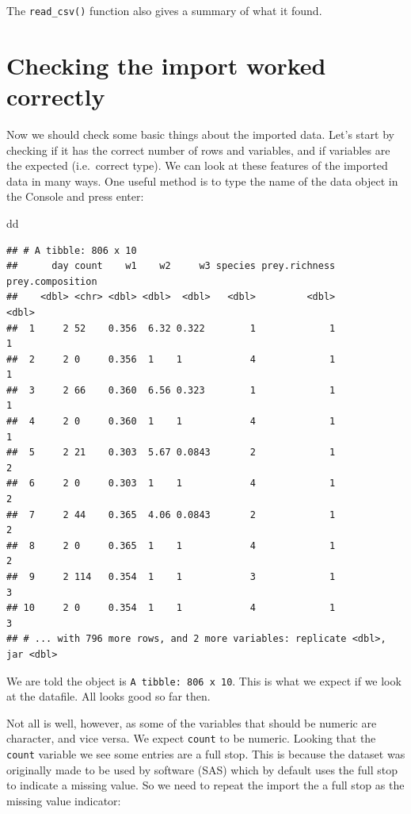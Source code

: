 \documentclass[]{book}
\newenvironment{Shaded}{\begin{snugshade}}{\end{snugshade}}
\newcommand{\NormalTok}[1]{#1}
\begin{document}
The \texttt{read\_csv()} function also gives a summary of what it found.

\hypertarget{checking-the-import-worked-correctly}{%
\section{Checking the import worked correctly}\label{checking-the-import-worked-correctly}}

Now we should check some basic things about the imported data. Let's start by checking if it has the correct number of rows and variables, and if variables are the expected (i.e.~correct type). We can look at these features of the imported data in many ways. One useful method is to type the name of the data object in the Console and press enter:

\begin{Shaded}
\begin{Highlighting}[]
\NormalTok{dd}
\end{Highlighting}
\end{Shaded}

\begin{verbatim}
## # A tibble: 806 x 10
##      day count    w1    w2     w3 species prey.richness prey.composition
##    <dbl> <chr> <dbl> <dbl>  <dbl>   <dbl>         <dbl>            <dbl>
##  1     2 52    0.356  6.32 0.322        1             1                1
##  2     2 0     0.356  1    1            4             1                1
##  3     2 66    0.360  6.56 0.323        1             1                1
##  4     2 0     0.360  1    1            4             1                1
##  5     2 21    0.303  5.67 0.0843       2             1                2
##  6     2 0     0.303  1    1            4             1                2
##  7     2 44    0.365  4.06 0.0843       2             1                2
##  8     2 0     0.365  1    1            4             1                2
##  9     2 114   0.354  1    1            3             1                3
## 10     2 0     0.354  1    1            4             1                3
## # ... with 796 more rows, and 2 more variables: replicate <dbl>, jar <dbl>
\end{verbatim}

We are told the object is \texttt{A\ tibble:\ 806\ x\ 10}. This is what we expect if we look at the datafile. All looks good so far then.

Not all is well, however, as some of the variables that should be numeric are character, and vice versa. We expect \texttt{count} to be numeric. Looking that the \texttt{count} variable we see some entries are a full stop. This is because the dataset was originally made to be used by software (SAS) which by default uses the full stop to indicate a missing value. So we need to repeat the import the a full stop as the missing value indicator:
\end{document}
